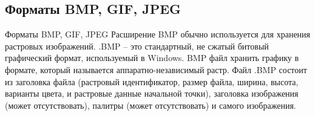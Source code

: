 \documentclass{beamer}
\begin{document}
\subsection{Форматы BMP, GIF, JPEG}
\begin{frame}{Форматы BMP, GIF, JPEG}
Расширение BMP обычно используется для хранения растровых изображений. .BMP – это стандартный, не сжатый битовый графический формат, используемый в Windows. BMP файл хранить графику в формате, который называется аппаратно-независимый растр. Файл .BMP состоит из заголовка файла (растровый идентификатор, размер файла, ширина, высота, варианты цвета, и растровые данные начальной точки), заголовка изображения (может отсутствовать), палитры (может отсутствовать) и самого изображения.\\
\begin{figure}[H]
\begin{center}
\begin{minipage}[h]{0.25\linewidth}
  \\
\end{minipage}
\end{center}
\end{figure}
\end{frame}
\end{document}
